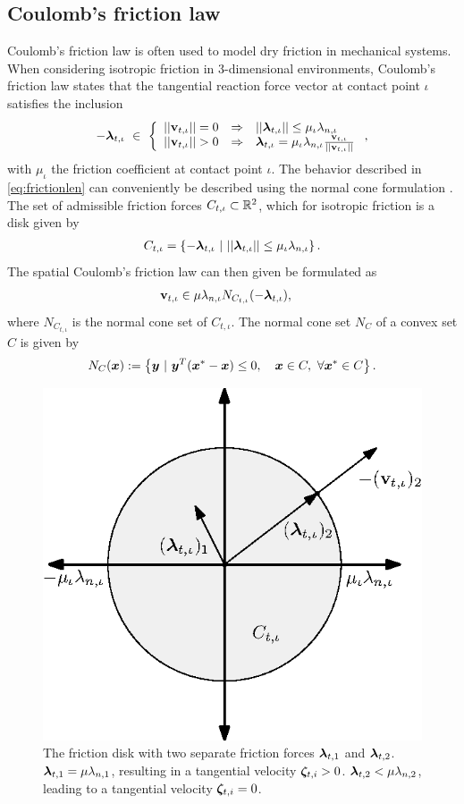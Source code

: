 \documentclass[../DC2019003Bouma.tex]{subfiles}
\begin{document}
\subsection{Coulomb's friction law}\label{sec:2fric}
Coulomb's friction law is often used to model dry friction in mechanical systems. When considering isotropic friction in 3-dimensional environments, Coulomb's friction law states that the tangential reaction force vector at contact point $\iota$ satisfies the inclusion
\begin{align}
-\lambdab_{t,\iota}\ \in\ \left\{ \begin{array}{lll}
||\vbf_{t,\iota}||=0 & \Rightarrow & ||\lambdab_{t,\iota}||\leq\mu_{\iota}\lambda_{n,\iota}\\
||\vbf_{t,\iota}||>0 & \Rightarrow & \lambdab_{t,\iota} = \mu_{\iota}\lambda_{n,\iota}\frac{\vbf_{t,\iota}}{||\vbf_{t,\iota}||}
\end{array}\right.,\label{eq:frictionlen}
\end{align}
%
with $\mu_{\iota}$ the friction coefficient at contact point $\iota$. The behavior described in \eqref{eq:frictionlen} can conveniently be described using the normal cone formulation \cite[Section 5.3.2]{Leine2008}. The set of admissible friction forces $C_{t,\iota}\subset\mathbb{R}^2$, which for isotropic friction is a disk given by
\begin{align}
C_{t,\iota} = \left\{-\boldsymbol{\lambda}_{t,\iota}\ |\ ||\boldsymbol{\lambda}_{t,\iota}|| \leq \mu_{\iota}\lambda_{n,\iota}\right\}.
\end{align}
The spatial Coulomb's friction law can then given be formulated as
\begin{align}
\mathbf{v}_{t,\iota} &\in \mu\lambda_{n,\iota}N_{C_{t,\iota}}(-\boldsymbol{\lambda}_{t,\iota}),\label{eq:2vNC}
\end{align}
where $N_{C_{t,\iota}}$ is the normal cone set of $C_{t,\iota}$. The normal cone set $N_{C}$ of a convex set $C$ is given by
\begin{align}
N_{C}(\xb) := \left\{\yb\ |\ \yb^T(\xb^\ast-\xb)\leq 0,\quad \xb\in C,\ \forall\xb^\ast\in C \right\}.
\end{align}

\begin{figure}[bt!]
\centering
\includegraphics[width=.4\textwidth]{2frictiondisk.eps}\caption{The friction disk with two separate friction forces $\boldsymbol{\lambda}_{t,1}$ and $\boldsymbol{\lambda}_{t,2}$. $\boldsymbol{\lambda}_{t,1} = \mu\lambda_{n,1}$, resulting in a tangential velocity $\boldsymbol{\zeta}_{t,i}>0$. $\boldsymbol{\lambda}_{t,2}<\mu\lambda_{n,2}$, leading to a tangential velocity $\boldsymbol{\zeta}_{t,i}=0$.}\label{fig:2frictiondisk}
\end{figure}
\end{document}
